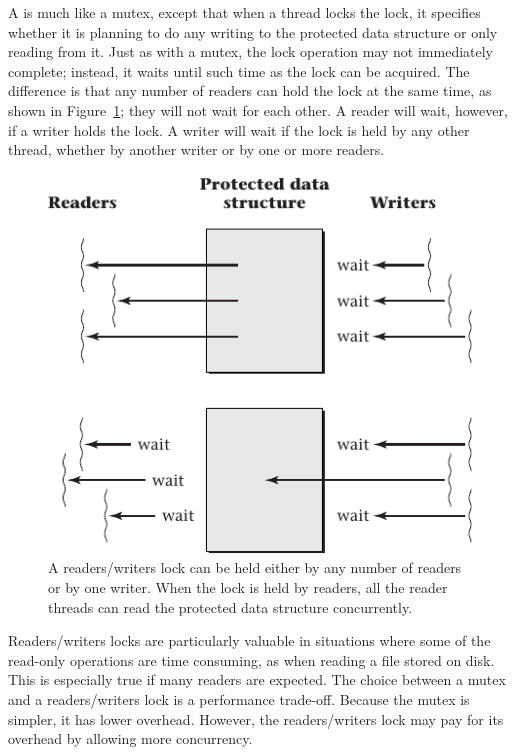 A  is much like a mutex, except that when a thread
locks the lock, it specifies whether it is planning to do any writing
to the protected data structure
or only reading from it.  Just as with a mutex, the lock operation may not
immediately complete; instead, it waits until such time as the lock
can be acquired.  The difference is that any number of readers can
hold the lock at the same time, as shown in Figure~\ref{scan-4-8}; they will not wait for each other.  A
reader will wait, however, if a writer holds the lock.  A writer will
wait if the lock is held by any other thread, whether by another
writer or by one or more readers.
\begin{figure}
\centerline{\includegraphics{hail_f0415}}
\caption{A readers/writers lock can be held either by
  any number of readers or by one writer.  When the lock is held by
  readers, all the reader threads can read the protected data
  structure concurrently.}
\label{scan-4-8}
\end{figure}

Readers/writers locks are particularly valuable in situations where
some of the read-only operations are time consuming, as when reading a
file stored on disk.  This is especially true if many readers are
expected.  The choice between a mutex and a readers/writers lock is a
performance trade-off.  Because the mutex is simpler, it has lower
overhead.  However, the readers/writers lock may pay for its overhead
by allowing more concurrency.

